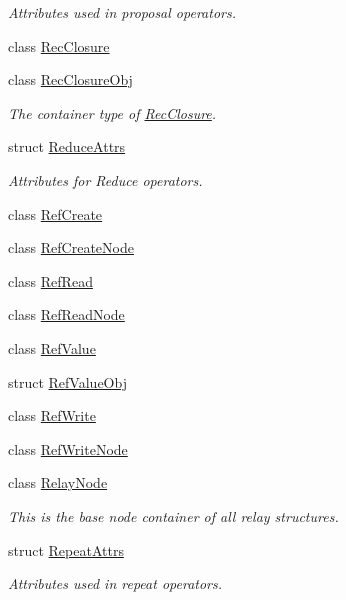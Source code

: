 \begin{DoxyCompactItemize}
\begin{DoxyCompactList}\small\item\em Attributes used in proposal operators. \end{DoxyCompactList}\item 
class \hyperlink{classtvm_1_1relay_1_1RecClosure}{Rec\+Closure}
\item 
class \hyperlink{classtvm_1_1relay_1_1RecClosureObj}{Rec\+Closure\+Obj}
\begin{DoxyCompactList}\small\item\em The container type of \hyperlink{classtvm_1_1relay_1_1RecClosure}{Rec\+Closure}. \end{DoxyCompactList}\item 
struct \hyperlink{structtvm_1_1relay_1_1ReduceAttrs}{Reduce\+Attrs}
\begin{DoxyCompactList}\small\item\em Attributes for Reduce operators. \end{DoxyCompactList}\item 
class \hyperlink{classtvm_1_1relay_1_1RefCreate}{Ref\+Create}
\item 
class \hyperlink{classtvm_1_1relay_1_1RefCreateNode}{Ref\+Create\+Node}
\item 
class \hyperlink{classtvm_1_1relay_1_1RefRead}{Ref\+Read}
\item 
class \hyperlink{classtvm_1_1relay_1_1RefReadNode}{Ref\+Read\+Node}
\item 
class \hyperlink{classtvm_1_1relay_1_1RefValue}{Ref\+Value}
\item 
struct \hyperlink{structtvm_1_1relay_1_1RefValueObj}{Ref\+Value\+Obj}
\item 
class \hyperlink{classtvm_1_1relay_1_1RefWrite}{Ref\+Write}
\item 
class \hyperlink{classtvm_1_1relay_1_1RefWriteNode}{Ref\+Write\+Node}
\item 
class \hyperlink{classtvm_1_1relay_1_1RelayNode}{Relay\+Node}
\begin{DoxyCompactList}\small\item\em This is the base node container of all relay structures. \end{DoxyCompactList}\item 
struct \hyperlink{structtvm_1_1relay_1_1RepeatAttrs}{Repeat\+Attrs}
\begin{DoxyCompactList}\small\item\em Attributes used in repeat operators. \end{DoxyCompactList}\item 

\end{DoxyCompactItemize}
